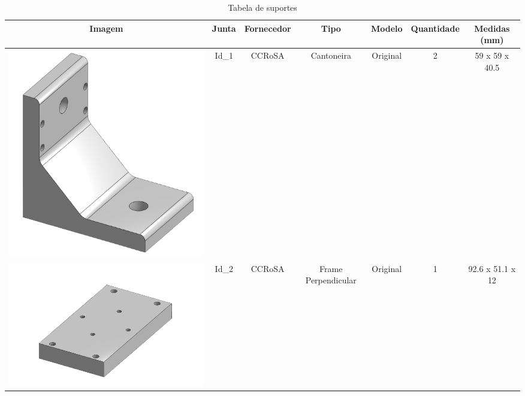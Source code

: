 \documentclass[
12pt,					%
openright,				%
twoside,				%
a4paper,				%
english,
brazil
]{ABNT/abntex2_report}
\begin{document}
	\begin{table}[H]
		\caption{Tabela de suportes}
		\begin{adjustbox}{max width=\textwidth}
		\begin{tabular}{|c|c|c|c|c|c|c|}
		\hline
		\rowcolor[HTML]{EFEFEF} 
		Imagem                 & Junta & Fornecedor     & Tipo                & Modelo               & Quantidade & Medidas (mm)          \\ \hline
		\includegraphics[scale=0.12]{appendix/cantoneira.png}          & Id\_1 & CCRoSA         & Cantoneira          & Original             & 2          & 59 x 59 x 40.5        \\ \hline
		\rowcolor[HTML]{EFEFEF} 
		\includegraphics[scale=0.12]{appendix/ffixper1.png}               & Id\_2 & CCRoSA         & Frame Perpendicular & Original             & 1          & 92.6 x 51.1 x 12      \\ \hline

\end{tabular}
\end{adjustbox}
\end{table}
\end{document}
